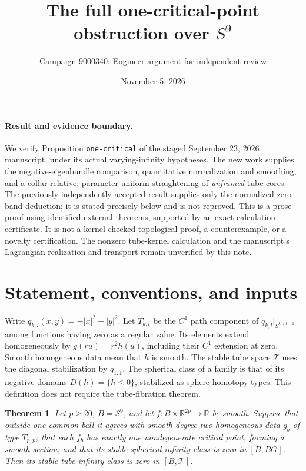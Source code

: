 \documentclass[11pt]{article}
\title{The full one-critical-point obstruction over \(S^9\)}
\author{Campaign 9000340: Engineer argument for independent review}
\date{November 5, 2026}
\newtheorem{theorem}{Theorem}
\newcommand{\R}{\mathbb R}
\newcommand{\T}{\mathcal T}
\begin{document}
\maketitle

\paragraph{Result and evidence boundary.}
We verify Proposition \texttt{one-critical} of the staged September 23,
2026 manuscript, under its actual varying-infinity hypotheses.
The new work supplies the negative-eigenbundle comparison, quantitative
normalization and smoothing, and a collar-relative, parameter-uniform
straightening of \emph{unframed} tube cores.
The previously independently accepted result supplies only the normalized
zero-band deduction; it is stated precisely below and is not reproved.
This is a prose proof using identified external theorems, supported by an
exact calculation certificate. It is not a kernel-checked topological
proof, a counterexample, or a novelty certification.
The nonzero tube-kernel calculation and the manuscript's Lagrangian
realization and transport remain unverified by this note.

\section{Statement, conventions, and inputs}

Write \(q_{k,l}(x,y)=-|x|^2+|y|^2\).
Let \(T_{k,l}\) be the \(C^1\) path component of
\(q_{k,l}|_{S^{k+l-1}}\) among functions having zero as a regular value.
Its elements extend homogeneously by \(g(ru)=r^2h(u)\), including their
\(C^1\) extension at zero. Smooth homogeneous data mean that \(h\) is
smooth. The stable tube space \(\T\) uses the diagonal stabilization
by \(q_{1,1}\). The spherical class of a family is that of its
negative domains \(D(h)=\{h\leq0\}\), stabilized as sphere homotopy types.
This definition does not require the tube-fibration theorem.

\begin{theorem}\label{thm:main}
Let \(p\geq20\), \(B=S^9\), and let
\(f:B\times\R^{2p}\longrightarrow\R\) be smooth.
Suppose that outside one common ball it agrees with smooth
degree-two homogeneous data \(g_b\) of type \(T_{p,p}\);
that each \(f_b\) has exactly one nondegenerate critical point,
forming a smooth section; and that its stable spherical infinity class
is zero in \([B,BG]\).
Then its stable tube infinity class is zero in \([B,\T]\).
\end{theorem}
\end{document}
